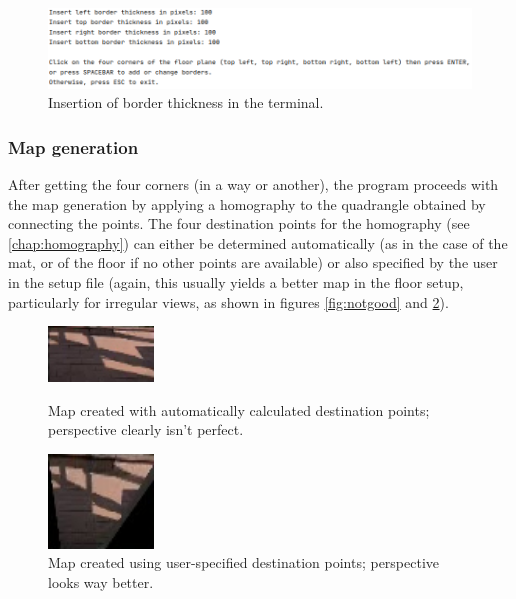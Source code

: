 \documentclass[12pt]{article}
\begin{document}
\begin{figure}[H]
\begin{center}
    \includegraphics[height=0.18\linewidth]{img/borders_terminal.png}
\end{center}
   \caption{Insertion of border thickness in the terminal.}
\label{fig:bordersterminal}
\end{figure}

\subsubsection{Map generation}
\label{chap:map}
After getting the four corners (in a way or another), the program proceeds with the map generation by applying a homography to the quadrangle obtained by connecting the points. The four destination points for the homography (see \ref{chap:homography}) can either be determined automatically (as in the case of the mat, or of the floor if no other points are available) or also specified by the user in the setup file (again, this usually yields a better map in the floor setup, particularly for irregular views, as shown in figures \ref{fig:notgood} and \ref{fig:good}).

\begin{figure}[H]
  \centering
  \begin{minipage}[b]{0.45\textwidth}
    \centering
    \includegraphics[width=2.8cm,keepaspectratio]{img/auto_map.jpg}
    \caption{Map created with automatically calculated destination points; perspective clearly isn't perfect.}
    \label{fig:notgood}
  \end{minipage}
  \hfill
  \begin{minipage}[b]{0.45\textwidth}
    \centering
    \includegraphics[width=2.8cm,keepaspectratio]{img/nice_map.jpg}
    \caption{Map created using user-specified destination points; perspective looks way better.}
    \label{fig:good}
  \end{minipage}
\end{figure}
\end{document}
